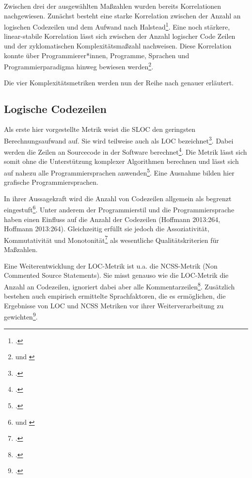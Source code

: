 Zwischen drei der ausgewählten Maßzahlen wurden bereits Korrelationen
nachgewiesen. Zunächst besteht eine starke Korrelation zwischen der
Anzahl an logischen Codezeilen und dem Aufwand nach Halstead\footcite[Vgl. ][S. 627]{jonesAppliedSoftwareMeasurement2008}. Eine noch stärkere, linear-stabile Korrelation lässt sich
zwischen der Anzahl logischer Code Zeilen und der zyklomatischen
Komplexitätsmaßzahl nachweisen. Diese Korrelation konnte über
Programmierer*innen, Programme, Sprachen und Programmierparadigma hinweg
bewiesen werden\footnote{\cite[Vgl. ][S. 627]{jonesAppliedSoftwareMeasurement2008} und \cite[S. 137]{jayCyclomaticComplexityLines2009}}.

Die vier Komplexitätsmetriken werden nun der Reihe nach genauer
erläutert.

\subsection{Logische Codezeilen}\label{logische-codezeilen}

Als erste hier vorgestellte Metrik weist die \ac{SLOC} den geringsten Berechnungsaufwand auf. Sie wird
teilweise auch als \ac{LOC} bezeichnet\footcite[Vgl. ][S. 263]{hoffmannSoftwareQualitat2013}. Dabei werden die Zeilen an Sourcecode in der Software
berechnet\footcite[Vgl. ][S. 2]{rumreichExaminingSoftwareDesign2019}. Die Metrik lässt
sich somit ohne die Unterstützung komplexer Algorithmen berechnen und
lässt sich auf nahezu alle Programmiersprachen anwenden\footcite[Vgl. ][S. 263]{hoffmannSoftwareQualitat2013}. Eine Ausnahme bilden hier grafische
Programmiersprachen.

In ihrer Aussagekraft wird die Anzahl von Codezeilen allgemein als
begrenzt eingestuft\footnote{\cite[Vgl. ][S. 264]{hoffmannSoftwareQualitat2013} 
und \cite[S. 2]{rumreichExaminingSoftwareDesign2019}}. Unter anderem der Programmierstil und die Programmiersprache
haben einen Einfluss auf die Anzahl der Codezeilen (Hoffmann 2013:264,
Hoffmann 2013:264). Gleichzeitig erfüllt sie jedoch die Assoziativität,
Kommutativität und Monotonität\footcite[Vgl. ][S. 142]{zuseSoftwareComplexityMeasures1991} als wesentliche Qualitätskriterien für Maßzahlen.

Eine Weiterentwicklung der LOC-Metrik ist u.a. die NCSS-Metrik (Non
Commented Source Statements). Sie misst genauso wie die LOC-Metrik die
Anzahl an Codezeilen, ignoriert dabei aber alle Kommentarzeilen\footcite[Vgl. ][S. 264]{hoffmannSoftwareQualitat2013}. Zusätzlich bestehen auch empirisch ermittelte
Sprachfaktoren, die es ermöglichen, die Ergebnisse von LOC und NCSS
Metriken vor ihrer Weiterverarbeitung zu gewichten\footcite[Vgl. ][S. 264]{hoffmannSoftwareQualitat2013}.

